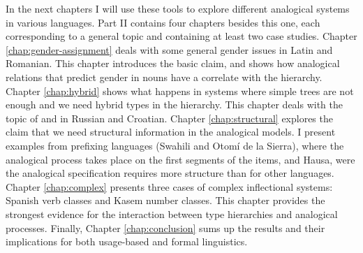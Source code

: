 In the next chapters I will use these tools to explore different analogical systems in various languages. Part II contains four chapters besides this one, each corresponding to a general topic and containing at least two case studies. Chapter \ref{chap:gender-assignment} deals with some general gender issues in Latin and Romanian. This chapter introduces the basic claim, and shows how analogical relations that predict gender in nouns have a correlate with the hierarchy. Chapter \ref{chap:hybrid} shows what happens in systems where simple trees are not enough and we need hybrid types in the hierarchy. This chapter deals with the topic of  and  in Russian and Croatian. Chapter \ref{chap:structural} explores the claim that we need structural information in the analogical models. I present examples from prefixing languages (Swahili and Otomí de la Sierra), where the analogical process takes place on the first segments of the items, and Hausa, were the analogical specification requires more structure than for other languages. Chapter \ref{chap:complex} presents three cases of complex inflectional systems: Spanish verb classes and Kasem number classes. This chapter provides the strongest evidence for the interaction between type hierarchies and analogical processes. Finally, Chapter \ref{chap:conclusion} sums up the results and their implications for both usage-based and formal linguistics.


